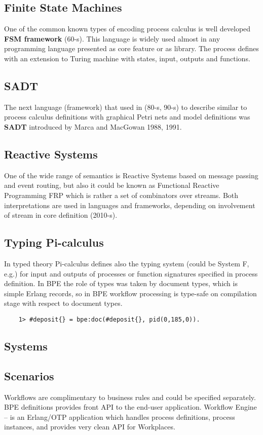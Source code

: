 \subsection{Finite State Machines}
One of the common known types of encoding process calculus is well developed {\bf FSM framework} (60-s).
This language is widely used almost in any programming language presented as core
feature or as library. The process defines with an extension to Turing machine
with states, input, outputs and functions.

\subsection{SADT}
The next language (framework) that used in (80-s, 90-s) to describe similar
to process calculus definitions with graphical Petri nets and model definitions
was {\bf SADT} introduced by Marca and MacGowan 1988, 1991.

\subsection{Reactive Systems}
One of the wide range of semantics is Reactive Systems based on message passing
and event routing, but also it could be known as Functional Reactive Programming FRP
which is rather a set of combinators over streams. Both interpretations are
used in languages and frameworks, depending on involvement of stream in core
definition (2010-s).

\subsection{Typing Pi-calculus}
In typed theory Pi-calculus defines also the typing system (could be System F, e.g.) for
input and outputs of processes or function signatures specified in process definition.
In BPE the role of types was taken by document types, which is simple Erlang records,
so in BPE workflow processing is type-safe on compilation stage with respect to document types.

\vspace{1\baselineskip}
\begin{lstlisting}
    1> #deposit{} = bpe:doc(#deposit{}, pid(0,185,0)).
\end{lstlisting}
\subsection{Systems}

\subsection{Scenarios}
Workflows are complimentary to business rules and could be specified separately.
BPE definitions provides front API to the end-user application.
Workflow Engine -- is an Erlang/OTP application which handles process definitions,
process instances, and provides very clean API for Workplaces.

